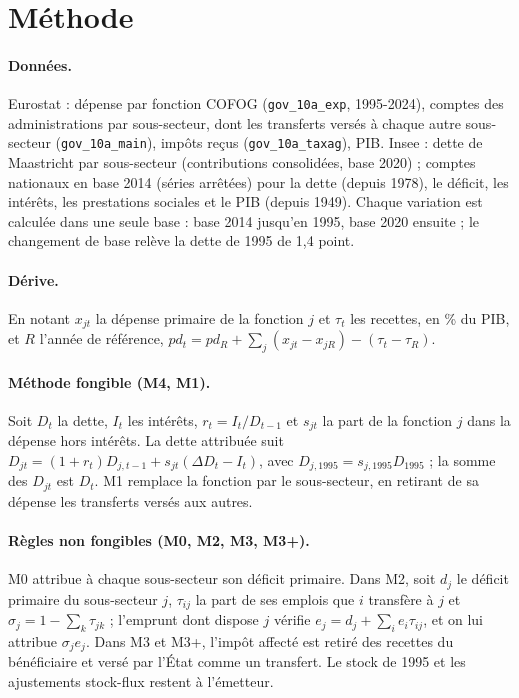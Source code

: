 \documentclass[11pt,a4paper]{article}
\begin{document}
\appendix
\section{Méthode}\label{sec:annexe}

\paragraph{Données.} Eurostat : dépense par fonction COFOG (\texttt{gov\_10a\_exp}, 1995-2024),
comptes des administrations par sous-secteur, dont les transferts versés à chaque autre sous-secteur
(\texttt{gov\_10a\_main}), impôts reçus (\texttt{gov\_10a\_taxag}), PIB. Insee : dette de
Maastricht par sous-secteur (contributions consolidées, base 2020) ; comptes nationaux en base 2014
(séries arrêtées) pour la dette (depuis 1978), le déficit, les intérêts, les prestations sociales
et le PIB (depuis 1949). Chaque variation est calculée dans une seule base : base 2014 jusqu'en 1995,
base 2020 ensuite ; le changement de base relève la dette de 1995 de 1,4 point.

\paragraph{Dérive.} En notant $x_{jt}$ la dépense primaire de la fonction $j$ et $\tau_t$ les
recettes, en \% du PIB, et $R$ l'année de référence, $pd_t=pd_R+\sum_j(x_{jt}-x_{jR})-(\tau_t-\tau_R)$.

\paragraph{Méthode fongible (M4, M1).} Soit $D_t$ la dette, $I_t$ les intérêts, $r_t=I_t/D_{t-1}$
et $s_{jt}$ la part de la fonction $j$ dans la dépense hors intérêts. La dette attribuée suit
$D_{jt}=(1+r_t)D_{j,t-1}+s_{jt}(\Delta D_t-I_t)$, avec $D_{j,1995}=s_{j,1995}D_{1995}$ ; la somme
des $D_{jt}$ est $D_t$. M1 remplace la fonction par le sous-secteur, en retirant de sa dépense les
transferts versés aux autres.

\paragraph{Règles non fongibles (M0, M2, M3, M3+).} M0 attribue à chaque sous-secteur son déficit
primaire. Dans M2, soit $d_j$ le déficit primaire du sous-secteur $j$, $\tau_{ij}$ la part de ses
emplois que $i$ transfère à $j$ et $\sigma_j=1-\sum_k\tau_{jk}$ ; l'emprunt dont dispose $j$
vérifie $e_j=d_j+\sum_i e_i\tau_{ij}$, et on lui attribue $\sigma_je_j$. Dans M3 et M3+, l'impôt
affecté est retiré des recettes du bénéficiaire et versé par l'État comme un transfert. Le stock de
1995 et les ajustements stock-flux restent à l'émetteur.
\end{document}
